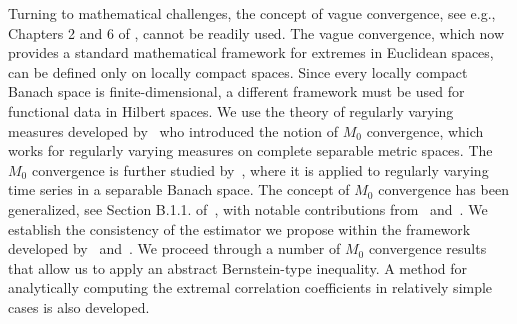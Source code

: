\documentclass[lineno]{biometrika}
\begin{document}
Turning to mathematical challenges, the concept of vague convergence, see e.g., Chapters 2 and 6 of \citet{resnick:2007}, cannot be readily used. The vague convergence, which now provides a standard mathematical framework for extremes in Euclidean spaces, can be defined only on locally compact spaces. Since every locally compact Banach space is finite-dimensional, a different framework must be used for functional data in Hilbert spaces. We use the theory of regularly varying measures developed by~\citet{hult:lindskog:2006} who introduced the notion of $M_0$ convergence, which works for regularly varying measures on complete separable metric spaces. The $M_0$ convergence is further studied by~\citet{meinguet:2010}, where it is applied to regularly varying time series in a separable Banach space. The concept of $M_0$ convergence has been  generalized,
see Section B.1.1. of~\citet{kulik:soulier:2020}, with notable contributions from~\citet{lindskog:resnick:roy:2014} and~\citet{segers:zhao:meinguet:2017}. We establish the consistency of the estimator we propose within the framework developed by~\citet{hult:lindskog:2006} and~\citet{meinguet:2010}. We proceed through a number of $M_0$ convergence results that allow us to apply an abstract Bernstein-type inequality. A method for analytically computing the extremal correlation coefficients in relatively simple cases is also developed.


\end{document}
